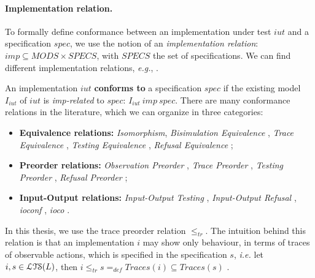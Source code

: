 \paragraph{Implementation relation.} To formally define
conformance between an implementation under test $iut$ and a
specification $spec$, we use the notion of an
\emph{implementation relation}: $imp \subseteq MODS \times
SPECS$, with $SPECS$ the set of specifications. We can find
different implementation relations, \emph{e.g.},
\cite{Bri88,phalippou94}.

An implementation $iut$ \textbf{conforms to} a specification
$spec$ if the existing model $I_{iut}$ of $iut$ is
\textit{imp-related} to $spec$: $I_{iut} ~imp~ spec$.
There are many conformance relations in the literature, which we
can organize in three categories:

\begin{itemize}
    \item \textbf{Equivalence relations:} \emph{Isomorphism},
        \emph{Bisimulation Equivalence}
        \cite{milner1989communication,Fernandez89animplementation},
        \emph{Trace Equivalence} \cite{tan_testing_1995},
        \emph{Testing Equivalence} \cite{Abramsky1987225},
        \emph{Refusal Equivalence} \cite{Phillips86};

    \item \textbf{Preorder relations:} \emph{Observation
        Preorder} \cite{milner1980calculus,hennessy1980observing},
        \emph{Trace Preorder}
        \cite{DNH84,vaandrager1991relationship},
        \emph{Testing Preorder} \cite{DNH84,Beohar2015},
        \emph{Refusal Preorder} \cite{phillips1987refusal};

    \item \textbf{Input-Output relations:} \emph{Input-Output
        Testing} \cite{Tre96}, \emph{Input-Output Refusal}
        \cite{heerink1997refusal}, \emph{ioconf}
        \cite{tretmans1996conformance}, \emph{ioco} \cite{Tre96}.
\end{itemize}

In this thesis, we use the trace preorder relation $\leq_{tr}$.
The intuition behind this relation is that an implementation $i$
may show only behaviour, in terms of traces of observable
actions, which is specified in the specification $s$, \emph{i.e.}
let $i, s \in \EuScript{LTS}(L)$, then $i \leq_{tr} s =_{def}
Traces(i) \subseteq Traces(s)$ \cite{Tre96}.


